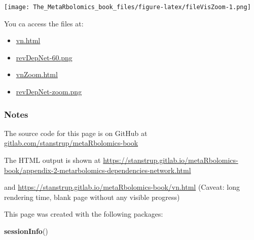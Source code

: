 \documentclass[]{article}
\newenvironment{Shaded}{\begin{snugshade}}{\end{snugshade}}
\newcommand{\KeywordTok}[1]{\textcolor[rgb]{0.13,0.29,0.53}{\textbf{#1}}}
\newcommand{\NormalTok}[1]{#1}
\providecommand{\tightlist}{%
  \setlength{\itemsep}{0pt}\setlength{\parskip}{0pt}}
\begin{document}
\texttt{[image: The\_MetaRbolomics\_book\_files/figure-latex/fileVisZoom-1.png]}

You ca access the files at:

\begin{itemize}
\tightlist
\item
  \url{vn.html}
\item
  \url{revDepNet-60.png}
\item
  \url{vnZoom.html}
\item
  \url{revDepNet-zoom.png}
\end{itemize}

\hypertarget{notes}{%
\subsubsection*{Notes}\label{notes}}

The source code for this page is on GitHub at \href{https://gitlab.com/stanstrup/metaRbolomics-book}{gitlab.com/stanstrup/metaRbolomics-book}

The HTML output is shown at
\href{appendix-2-metarbolomics-dependencies-network.html}{https://stanstrup.gitlab.io/metaRbolomics-book/appendix-2-metarbolomics-dependencies-network.html}

and \href{vn.html}{https://stanstrup.gitlab.io/metaRbolomics-book/vn.html} (Caveat: long rendering time, blank page without any visible progress)

This page was created with the following packages:

\begin{Shaded}
\begin{Highlighting}[]
\KeywordTok{sessionInfo}\NormalTok{()}
\end{Highlighting}
\end{Shaded}
\end{document}
